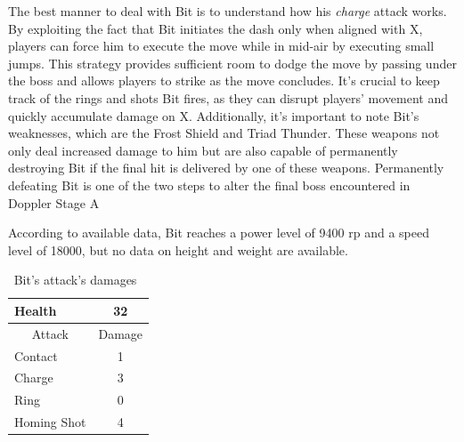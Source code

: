 The best manner to deal with Bit is to understand how his \emph{charge} attack works. By exploiting the fact that Bit initiates the dash only when aligned with X, players can force him to execute the move while in mid-air by executing small jumps. This strategy provides sufficient room to dodge the move by passing under the boss and allows players to strike as the move concludes. It's crucial to keep track of the rings and shots Bit fires, as they can disrupt players' movement and quickly accumulate damage on X. Additionally, it's important to note Bit's weaknesses, which are the Frost Shield and Triad Thunder. These weapons not only deal increased damage to him but are also capable of permanently destroying Bit if the final hit is delivered by one of these weapons. Permanently defeating Bit is one of the two steps to alter the final boss encountered in Doppler Stage A

According to available data, Bit reaches a power level of 9400 rp and a speed level of 18000, but no data on height and weight are available.

\begin{table}[htp]
	\centering
	\begin{tabular}[h]{l c}
		\toprule
		Health  & 32\\
		\midrule
		\multicolumn{1}{c}{Attack} & \multicolumn{1}{c}{Damage}\\
		Contact & 1\\
		Charge& 3\\
		Ring& 0\\
		Homing Shot& 4\\
		\bottomrule
	\end{tabular}
	\caption{Bit's attack's damages~\cite{wiki:Bit,book:Compendium}}
\end{table} 


